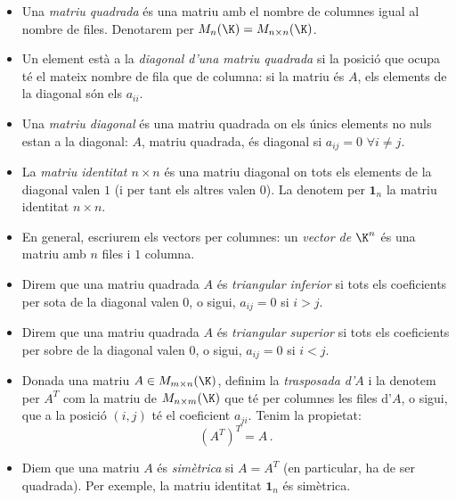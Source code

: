 \documentclass[a4paper,12pt,twoside]{article}
\newcommand{\1}{\mathbf{1}}
\newcommand{\0}{\mathbf{0}}
\theoremstyle{definition}
\theoremstyle{remark}
\begin{document}
\begin{itemize}
	\item Una \emph{matriu quadrada} és una matriu amb el nombre de columnes igual al nombre de files. Denotarem per $M_n(\K)=M_{n\times n}(\K)$.
	\item Un element està a la \emph{diagonal d'una matriu quadrada} si la posició que ocupa té el mateix nombre de fila que de columna: si la matriu és $A$, els elements de la diagonal són els $a_{ii}$.  
	\item Una \emph{matriu diagonal} és una matriu quadrada on els únics elements no nuls estan a la diagonal: $A$, matriu quadrada, és diagonal si $a_{ij}=0$ $\forall i\neq j$. 
	\item La \emph{matriu identitat $n\times n$} és una matriu diagonal on tots els elements de la diagonal valen $1$ (i per tant els altres valen $0$). La denotem per $\1_n$ la matriu identitat $n\times n$.
	\item En general, escriurem els vectors per columnes: un \emph{vector de $\K^n$} és una matriu amb $n$ files i $1$ columna.
	\item Direm que una matriu quadrada $A$ és \emph{triangular inferior} si tots els coeficients per sota de la diagonal valen $0$, o sigui, $a_ {ij}=0$ si $i>j$.
	\item Direm que una matriu quadrada $A$ és \emph{triangular superior} si tots els coeficients per sobre de la diagonal valen $0$, o sigui, $a_ {ij}=0$ si $i<j$.
	\item Donada una matriu $A \in M_{m\times n}(\K)$, definim la \emph{trasposada d'$A$} i la denotem per $A^T$ com la matriu de $M_{n\times m}(\K)$ que té per columnes les files d'$A$, o sigui, que a la posició $(i,j)$ té el coeficient $a_{ji}$. Tenim la propietat:
	$$
	(A^T)^T=A \,.
	$$
	\item Diem que una matriu $A$ és \emph{simètrica} si $A=A^T$ (en particular, ha de ser quadrada). Per exemple, la matriu identitat $\1_n$ és simètrica.
\end{itemize}
\end{document}

